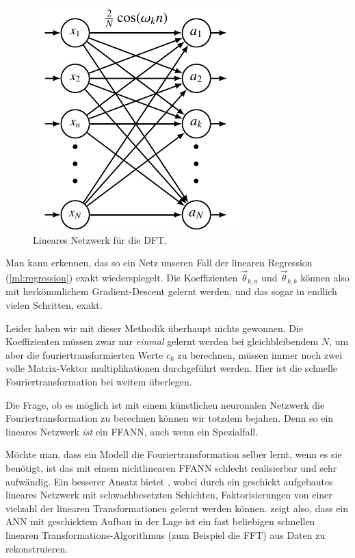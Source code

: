 \begin{figure}
    \centering
    \includegraphics[scale=0.8]{papers/ml/images/ann_dft_linear.pdf}
    \caption{Lineares Netzwerk für die DFT.}
    \label{fig:ml:dft-with-ann:linear}
\end{figure}

Man kann erkennen, das so ein Netz unseren Fall der linearen Regression
(\ref{ml:regression}) exakt wiederspiegelt. Die Koeffizienten $\vec \theta_{k,a}$ und
$\vec \theta_{k,b}$ können also mit herkömmlichem Gradient-Descent gelernt werden, und das
sogar in endlich vielen Schritten, exakt.

Leider haben wir mit dieser Methodik überhaupt nichts gewonnen. Die Koeffizienten müssen
zwar nur \emph{einmal} gelernt werden bei gleichbleibendem $N$, um aber die
fouriertransformierten Werte $c_k$ zu berechnen, müssen immer noch zwei volle
Matrix-Vektor multiplikationen durchgeführt werden. Hier ist die schnelle
Fouriertransformation bei weitem überlegen.

Die Frage, ob es möglich ist mit einem künstlichen neuronalen Netzwerk die Fouriertransformation zu
berechnen können wir totzdem bejahen. Denn so ein lineares Netzwerk \emph{ist} ein FFANN,
auch wenn ein Spezialfall.

Möchte man, dass ein Modell die Fouriertransformation selber lernt, wenn es
sie benötigt, ist das mit einem nichtlinearen FFANN schlecht realisierbar und sehr
aufwändig. Ein besserer Ansatz bietet \cite{ml:pmlr-v97-dao19a}, wobei durch ein geschickt
aufgebautes lineares Netzwerk mit schwachbesetzten Schichten, Faktorisierungen von einer
vielzahl der linearen Transformationen gelernt werden können. \cite{ml:pmlr-v97-dao19a}
zeigt also, dass ein ANN mit geschicktem Aufbau in der Lage ist ein fast beliebigen
schnellen linearen Transformations-Algorithmus (zum Beispiel die FFT) aus Daten zu rekonstruieren.